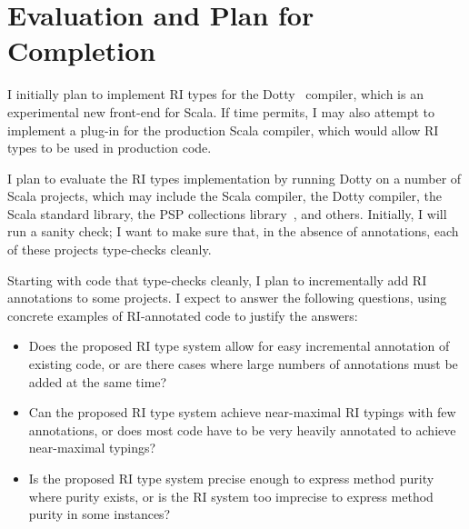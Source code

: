 \documentclass[letterpaper,11pt]{article}
\theoremstyle{definition}
\theoremstyle{remark}
\begin{document}

\section{Evaluation and Plan for Completion}
\label{evaluation}



I initially plan to implement RI types for the Dotty~\cite{dotty} compiler,
which is an experimental new front-end for Scala.
If time permits, I may also attempt to implement a plug-in for
the production Scala compiler, which would allow RI types to be used
in production code.


I plan to evaluate the RI types implementation
by running Dotty on a number of Scala projects,
which may include the Scala compiler, the Dotty compiler,
the Scala standard library, the PSP collections library~\cite{psp-page},
and others.
Initially, I will run a sanity check;
I want to make sure that, in the absence of annotations,
each of these projects type-checks cleanly.

Starting with code that type-checks cleanly, I plan to incrementally add RI annotations
to some projects.
I expect to answer the following questions, using concrete examples of
RI-annotated code to justify the answers:
\begin{itemize}
	\item Does the proposed RI type system allow for easy incremental annotation
	of existing code, or are there cases where large numbers of annotations must
	be added at the same time?
	\item Can the proposed RI type system achieve near-maximal RI typings
	with few annotations,
	or does most code have to be very heavily annotated to achieve near-maximal typings?
	\item Is the proposed RI type system precise enough to express method purity where purity exists,
	or is the RI system too imprecise to express method purity in some instances?
\end{itemize}

\end{document}
